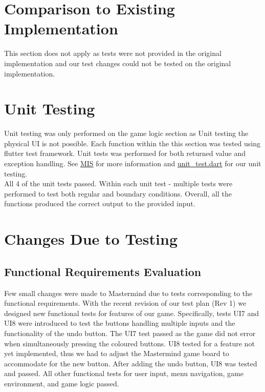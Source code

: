 \documentclass[12pt, titlepage]{article}
\begin{document}
\section{Comparison to Existing Implementation}	
This section does not apply as tests were not provided in the original implementation and our test changes could not be tested on the original implementation.

\section{Unit Testing}
Unit testing was only performed on the game logic section as Unit testing the physical UI is not possible. Each function within the this section was tested using flutter test framework. Unit tests was performed for both returned value and exception handling. See \href{https://gitlab.cas.mcmaster.ca/rosnej1/open-mastermind/-/blob/master/Doc/Design/MIS/MIS.pdf}{MIS} for more information and \href{https://gitlab.cas.mcmaster.ca/rosnej1/open-mastermind/-/blob/master/src/mastermind_gui/test/unit_test.dart}{unit\_test.dart} for our unit testing.\\

All 4 of the unit tests passed. Within each unit test - multiple tests were performed to test both regular and boundary conditions. Overall, all the functions produced the correct output to the provided input.

\section{Changes Due to Testing}

\subsection{Functional Requirements Evaluation}

Few small changes were made to Mastermind due to tests corresponding to the functional requirements. With the recent revision of our test plan (Rev 1) we designed new functional tests for features of our game. Specifically, tests UI7 and UI8 were introduced to test the buttons handling multiple inputs and the functionality of the undo button. The UI7 test passed as the game did not error when simultaneously pressing the coloured buttons. UI8 tested for a feature not yet implemented, thus we had to adjust the Mastermind game board to accommodate for the new button. After adding the undo button, UI8 was tested and passed. All other functional tests for user input, menu navigation, game environment, and game logic passed.
\end{document}
